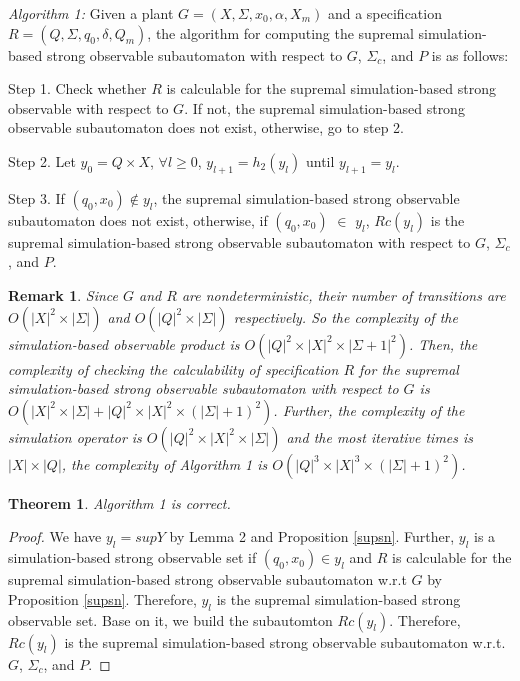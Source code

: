 \documentclass[12pt,draftcls,onecolumn]{IEEEtran}
\newtheorem{Theorem}{Theorem}
\newtheorem{Remark}{Remark}
\begin{document}
{\it Algorithm 1: } Given a plant $G =(X,\Sigma,x_{0},\alpha,X_{m})$
and a specification $R =(Q,\Sigma,q_{0},\delta,Q_{m})$, the
algorithm for computing the supremal simulation-based strong
observable subautomaton with respect to $G$, $\Sigma_c$, and $P$ is
as follows:

Step 1. Check whether $R$ is calculable for the supremal
simulation-based strong observable with respect to $G$. If not,
the supremal simulation-based strong observable subautomaton does
not exist, otherwise, go to step 2.

Step 2. Let $y_{0} = Q \times X$, $\forall l \geq 0$, $y_{l+1} =
h_{2}(y_{l})$ until $y_{l+1} = y_l$.

Step 3. If $(q_0, x_0) \notin y_l$, the supremal simulation-based
strong observable subautomaton does not exist, otherwise, if
$(q_0, x_0)$ $\in$ $y_l$, $Rc(y_l)$ is the supremal
simulation-based strong observable subautomaton with respect to
$G$, $\Sigma_c$, and $P$.



\begin{Remark}
Since $G$ and $R$ are nondeterministic, their number of
transitions are $O(|X|^2 \times |\Sigma|)$ and $O(|Q|^2 \times
|\Sigma|)$ respectively. So the complexity of the simulation-based
observable product is $O(|Q|^2 \times |X|^2 \times
|\Sigma+1|^{2})$. Then, the complexity of checking the
calculability of specification $R$ for the supremal
simulation-based strong observable subautomaton with respect to
$G$ is $O(|X|^{2} \times |\Sigma|+|Q|^2 \times |X|^2 \times
(|\Sigma|+1)^2)$. Further, the complexity of the simulation
operator is $O(|Q|^2 \times |X|^2 \times  |\Sigma|)$ and the most
iterative times is $|X| \times |Q|$, the complexity of Algorithm 1
is $O(|Q|^3 \times |X|^3 \times (|\Sigma|+1)^2)$.
\end{Remark}



\begin{Theorem}
Algorithm 1 is correct.
\end{Theorem}
\begin{proof}
We have $y_l = supY$ by Lemma 2 and Proposition \ref{supsn}.
Further, $y_l$ is a simulation-based strong observable set if
$(q_0, x_0) \in y_l$ and $R$ is calculable for the supremal
simulation-based strong observable subautomaton w.r.t $G$ by
Proposition \ref{supsn}. Therefore, $y_l$ is the supremal
simulation-based strong observable set. Base on it, we build the
subautomton $Rc(y_l)$. Therefore, $Rc(y_l)$ is the supremal
simulation-based strong observable subautomaton w.r.t. $G$,
$\Sigma_c$, and $P$.
\end{proof}
\end{document}
